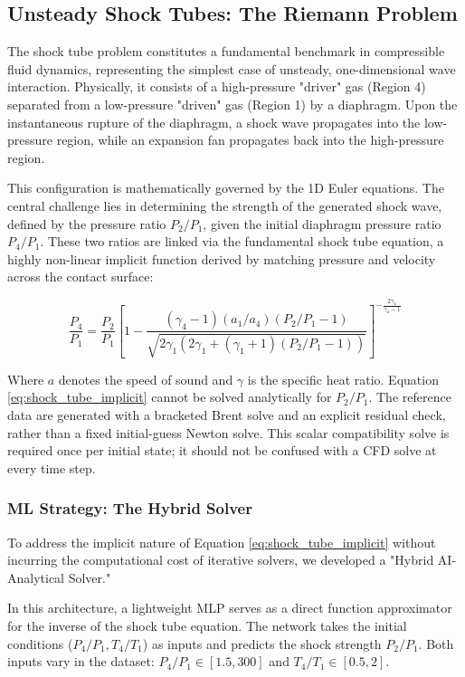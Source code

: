 \documentclass[preprint,12pt]{elsarticle}
\newcommand{\rev}[1]{#1}
\newcommand{\rev}[1]{\textcolor{revisionblue}{#1}}
\begin{document}
\subsection{Unsteady Shock Tubes: The Riemann Problem}

The shock tube problem constitutes a fundamental benchmark in compressible fluid dynamics, representing the simplest case of unsteady, one-dimensional wave interaction. Physically, it consists of a high-pressure "driver" gas (Region 4) separated from a low-pressure "driven" gas (Region 1) by a diaphragm. Upon the instantaneous rupture of the diaphragm, a shock wave propagates into the low-pressure region, while an expansion fan propagates back into the high-pressure region.

This configuration is mathematically governed by the 1D Euler equations. The central challenge lies in determining the strength of the generated shock wave, defined by the pressure ratio $P_{2}/P_{1}$, given the initial diaphragm pressure ratio $P_{4}/P_{1}$. These two ratios are linked via the fundamental shock tube equation, a highly non-linear implicit function derived by matching pressure and velocity across the contact surface:

\begin{equation}
    \frac{P_4}{P_1} = \frac{P_2}{P_1} \left[ 1 - \frac{(\gamma_4-1)(a_1/a_4)(P_2/P_1 - 1)}{\sqrt{2\gamma_1 \left( 2\gamma_1 + (\gamma_1+1)(P_2/P_1 - 1) \right)}} \right]^{-\frac{2\gamma_4}{\gamma_4-1}}
    \label{eq:shock_tube_implicit}
\end{equation}

Where $a$ denotes the speed of sound and $\gamma$ is the specific heat ratio. Equation \ref{eq:shock_tube_implicit} cannot be solved analytically for $P_2/P_1$. \rev{The reference data are generated with a bracketed Brent solve and an explicit residual check, rather than a fixed initial-guess Newton solve. This scalar compatibility solve is required once per initial state; it should not be confused with a CFD solve at every time step.}

\subsubsection{ML Strategy: The Hybrid Solver}

To address the implicit nature of Equation \ref{eq:shock_tube_implicit} without incurring the computational cost of iterative solvers, we developed a "Hybrid AI-Analytical Solver." 

In this architecture, a lightweight MLP serves as a direct function approximator for the inverse of the shock tube equation. The network takes the initial conditions ($P_4/P_1, T_4/T_1$) as inputs and predicts the shock strength $P_2/P_1$. \rev{Both inputs vary in the dataset: $P_4/P_1\in[1.5,300]$ and $T_4/T_1\in[0.5,2]$.}
\end{document}
